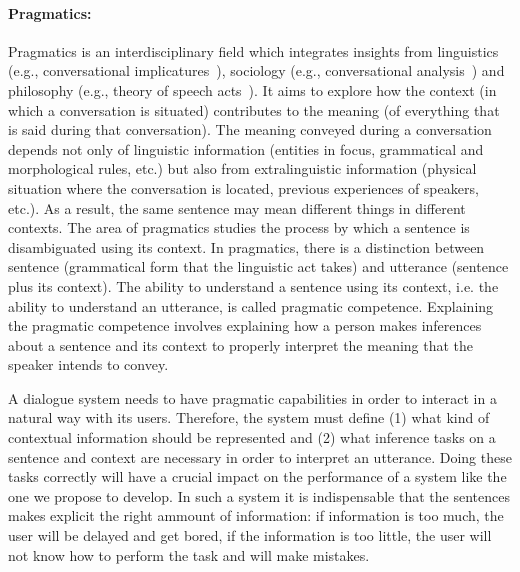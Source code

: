 \paragraph{Pragmatics:} Pragmatics is an interdisciplinary field which
integrates insights from linguistics (e.g., 
conversational implicatures~\cite{grice75}),
sociology (e.g., conversational analysis~\cite{schegloff87b}) and
philosophy (e.g., theory of speech acts~\cite{austin62}). It aims to explore how
the context (in which a conversation is situated) contributes to the meaning (of
everything that is said during that conversation). The meaning conveyed during
a conversation depends not only of linguistic information (entities in focus,
grammatical and morphological rules, etc.) but also from extralinguistic
information (physical situation where the conversation is located, previous
experiences of speakers, etc.). As a result, the same sentence may mean
different things in different contexts. The area of pragmatics studies the
process by which a sentence is disambiguated using its context. In pragmatics,
there is a distinction between sentence (grammatical form that
the linguistic act takes) and utterance (sentence plus its context). The ability
to understand a sentence using its context, i.e. the ability to understand an
utterance, is called pragmatic competence. Explaining the pragmatic competence
involves explaining how a person makes inferences about a sentence and its
context to properly interpret the meaning that the speaker intends to convey.
% 

A dialogue system needs to have pragmatic capabilities in order to interact in a
natural way with its users. Therefore, the system must define (1) what kind of
contextual information should be represented and (2) what inference tasks on a
sentence and context are necessary in order to interpret an utterance. Doing
these tasks correctly will have a crucial impact on the performance of a system
like the one we propose to develop. In such a system it is indispensable that
the sentences makes explicit the right ammount of information: if
information is too much, the user will be delayed and get bored, if the
information is too little, the user will not know how to perform the task and
will make mistakes.

